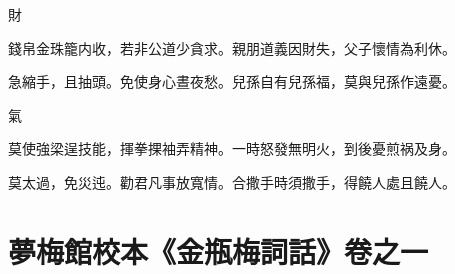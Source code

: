 \hspace*{1em}財

\begin{myquote0}
錢帛金珠籠内收，若非公道少貪求。親朋道義因財失，父子懷情為利休。

急縮手，且抽頭。免使身心晝夜愁。兒孫自有兒孫福，莫與兒孫作遠憂。
\end{myquote0}

\hspace*{1em}氣

\begin{myquote0}
莫使強梁逞技能，揮拳捰袖弄精神。一時怒發無明火，到後憂煎祸及身。

莫太過，免災迍。勸君凡事放寬情。合撒手時須撒手，得饒人處且饒人。
\end{myquote0}

\part*{夢梅館校本《金瓶梅詞話》卷之一}


